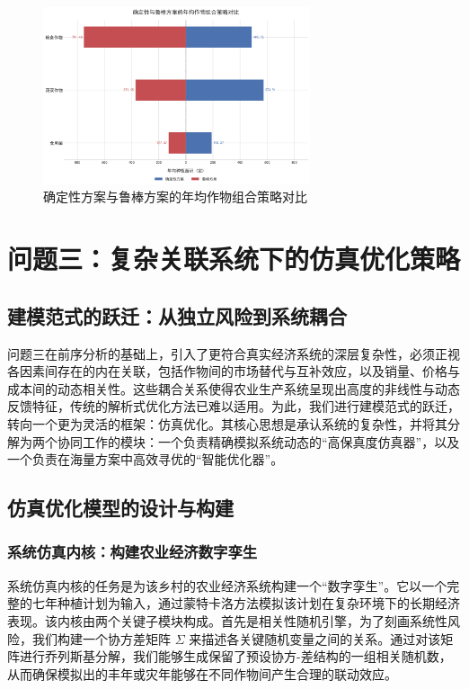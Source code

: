 \documentclass[withoutpreface,bwprint]{cumcmthesis} %
\begin{document}
\begin{figure}[htbp]
	\centering
	\includegraphics[width=0.7\textwidth]{figures/2_2.png}
	\caption{确定性方案与鲁棒方案的年均作物组合策略对比}
	\label{fig:2_2}
\end{figure}


\section{问题三：复杂关联系统下的仿真优化策略}

\subsection{建模范式的跃迁：从独立风险到系统耦合}

问题三在前序分析的基础上，引入了更符合真实经济系统的深层复杂性，必须正视各因素间存在的内在关联，包括作物间的市场替代与互补效应，以及销量、价格与成本间的动态相关性。这些耦合关系使得农业生产系统呈现出高度的非线性与动态反馈特征，传统的解析式优化方法已难以适用。为此，我们进行建模范式的跃迁，转向一个更为灵活的框架：仿真优化。其核心思想是承认系统的复杂性，并将其分解为两个协同工作的模块：一个负责精确模拟系统动态的“高保真度仿真器”，以及一个负责在海量方案中高效寻优的“智能优化器”。

\subsection{仿真优化模型的设计与构建}

\subsubsection{系统仿真内核：构建农业经济数字孪生}

系统仿真内核的任务是为该乡村的农业经济系统构建一个“数字孪生”。它以一个完整的七年种植计划为输入，通过蒙特卡洛方法模拟该计划在复杂环境下的长期经济表现。该内核由两个关键子模块构成。首先是相关性随机引擎，为了刻画系统性风险，我们构建一个协方差矩阵 $\Sigma$ 来描述各关键随机变量之间的关系。通过对该矩阵进行乔列斯基分解，我们能够生成保留了预设协方-差结构的一组相关随机数，从而确保模拟出的丰年或灾年能够在不同作物间产生合理的联动效应。
\end{document}
